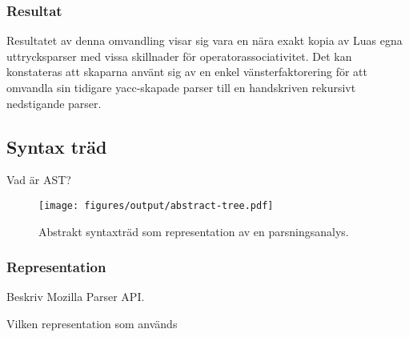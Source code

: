 \subsubsection{Resultat}

Resultatet av denna omvandling visar sig vara en nära exakt kopia av Luas egna
uttrycksparser med vissa skillnader för operatorassociativitet. Det kan
konstateras att skaparna använt sig av en enkel vänsterfaktorering för att
omvandla sin tidigare yacc-skapade parser till en handskriven rekursivt
nedstigande parser.

%
%
%

%
%

\subsection{Syntax träd}

Vad är AST?

\begin{figure}[ht]
  \texttt{[image: figures/output/abstract-tree.pdf]}
  \caption{Abstrakt syntaxträd som representation av en parsningsanalys.}
\end{figure}

\subsubsection{Representation}

Beskriv Mozilla Parser API.

Vilken representation som används

